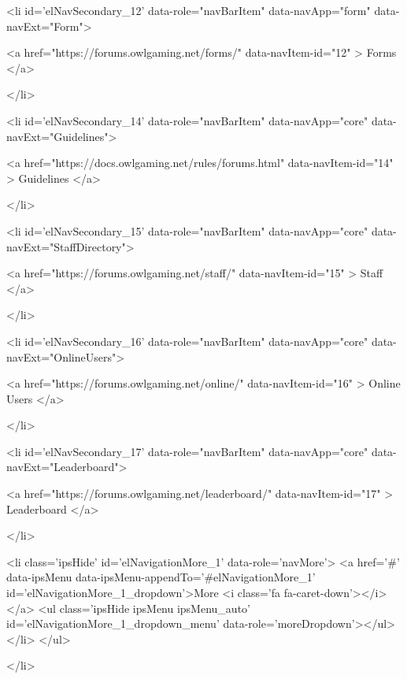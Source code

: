 	
		
		
		<li  id='elNavSecondary_12' data-role="navBarItem" data-navApp="form" data-navExt="Form">
			
			
				<a href="https://forums.owlgaming.net/forms/"  data-navItem-id="12"  >
					Forms
				</a>
			
			
		</li>
	
	

	
		
		
		<li  id='elNavSecondary_14' data-role="navBarItem" data-navApp="core" data-navExt="Guidelines">
			
			
				<a href="https://docs.owlgaming.net/rules/forums.html"  data-navItem-id="14"  >
					Guidelines
				</a>
			
			
		</li>
	
	

	
		
		
		<li  id='elNavSecondary_15' data-role="navBarItem" data-navApp="core" data-navExt="StaffDirectory">
			
			
				<a href="https://forums.owlgaming.net/staff/"  data-navItem-id="15"  >
					Staff
				</a>
			
			
		</li>
	
	

	
		
		
		<li  id='elNavSecondary_16' data-role="navBarItem" data-navApp="core" data-navExt="OnlineUsers">
			
			
				<a href="https://forums.owlgaming.net/online/"  data-navItem-id="16"  >
					Online Users
				</a>
			
			
		</li>
	
	

	
		
		
		<li  id='elNavSecondary_17' data-role="navBarItem" data-navApp="core" data-navExt="Leaderboard">
			
			
				<a href="https://forums.owlgaming.net/leaderboard/"  data-navItem-id="17"  >
					Leaderboard
				</a>
			
			
		</li>
	
	

					<li class='ipsHide' id='elNavigationMore_1' data-role='navMore'>
						<a href='#' data-ipsMenu data-ipsMenu-appendTo='#elNavigationMore_1' id='elNavigationMore_1_dropdown'>More <i class='fa fa-caret-down'></i></a>
						<ul class='ipsHide ipsMenu ipsMenu_auto' id='elNavigationMore_1_dropdown_menu' data-role='moreDropdown'></ul>
					</li>
				</ul>
			
		</li>
	
